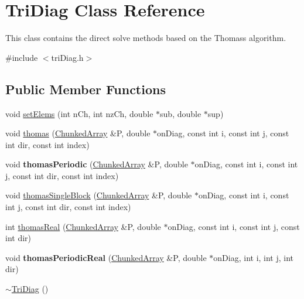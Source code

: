 \hypertarget{classTriDiag}{}\section{Tri\+Diag Class Reference}
\label{classTriDiag}


This class contains the direct solve methods based on the Thomas\textquotesingle{}s algorithm.  




{\ttfamily \#include $<$tri\+Diag.\+h$>$}

\subsection*{Public Member Functions}
\begin{DoxyCompactItemize}
\item 
void \mbox{\hyperlink{classTriDiag_ae024466ef1fb6844f5983f3f9d4ef467}{set\+Elems}} (int n\+Ch, int nz\+Ch, double $\ast$sub, double $\ast$sup)
\item 
void \mbox{\hyperlink{classTriDiag_a0fd3201443c200db98a9070f61cfff5c}{thomas}} (\mbox{\hyperlink{classChunkedArray}{Chunked\+Array}} \&P, double $\ast$on\+Diag, const int i, const int j, const int dir, const int index)
\item 
\mbox{\label{classTriDiag_a2a7b4e27358958997bc4608697e1271e}} 
void {\bfseries thomas\+Periodic} (\mbox{\hyperlink{classChunkedArray}{Chunked\+Array}} \&P, double $\ast$on\+Diag, const int i, const int j, const int dir, const int index)
\item 
void \mbox{\hyperlink{classTriDiag_ac7707e6fa080f96d060892bfd0fa9299}{thomas\+Single\+Block}} (\mbox{\hyperlink{classChunkedArray}{Chunked\+Array}} \&P, double $\ast$on\+Diag, const int i, const int j, const int dir, const int index)
\item 
int \mbox{\hyperlink{classTriDiag_a78abac130d55f38bf370887612a04c58}{thomas\+Real}} (\mbox{\hyperlink{classChunkedArray}{Chunked\+Array}} \&P, double $\ast$on\+Diag, const int i, const int j, const int dir)
\item 
\mbox{\label{classTriDiag_a1cf1d428f361a6ef0c94800a3b52f9a6}} 
void {\bfseries thomas\+Periodic\+Real} (\mbox{\hyperlink{classChunkedArray}{Chunked\+Array}} \&P, double $\ast$on\+Diag, int i, int j, int dir)
\item 
\mbox{\hyperlink{classTriDiag_a24c305b51d97fa6b0e3fda43d0b54d20}{$\sim$\+Tri\+Diag}} ()
\end{DoxyCompactItemize}


